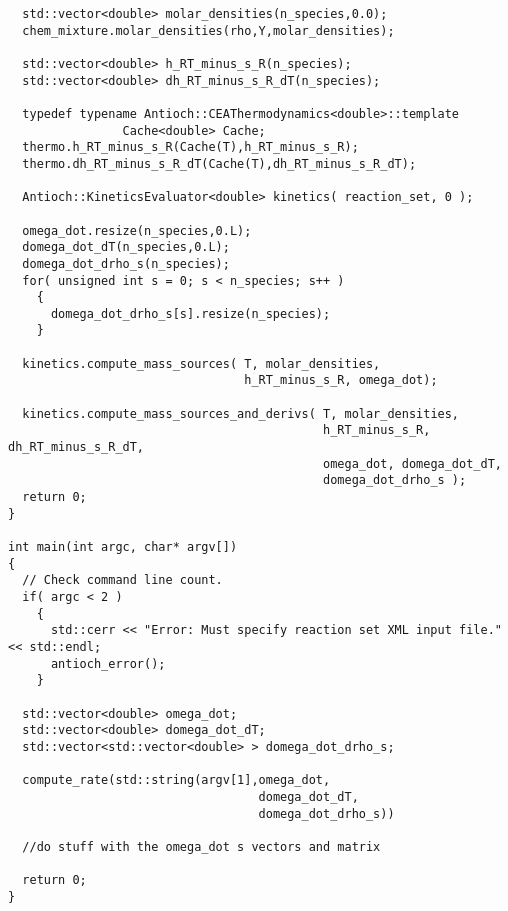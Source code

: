 \begin{verbatim}
  std::vector<double> molar_densities(n_species,0.0);
  chem_mixture.molar_densities(rho,Y,molar_densities);

  std::vector<double> h_RT_minus_s_R(n_species);
  std::vector<double> dh_RT_minus_s_R_dT(n_species);

  typedef typename Antioch::CEAThermodynamics<double>::template 
                Cache<double> Cache;
  thermo.h_RT_minus_s_R(Cache(T),h_RT_minus_s_R);
  thermo.dh_RT_minus_s_R_dT(Cache(T),dh_RT_minus_s_R_dT);

  Antioch::KineticsEvaluator<double> kinetics( reaction_set, 0 );

  omega_dot.resize(n_species,0.L);
  domega_dot_dT(n_species,0.L);
  domega_dot_drho_s(n_species);
  for( unsigned int s = 0; s < n_species; s++ )
    {
      domega_dot_drho_s[s].resize(n_species);
    }
  
  kinetics.compute_mass_sources( T, molar_densities, 
                                 h_RT_minus_s_R, omega_dot);

  kinetics.compute_mass_sources_and_derivs( T, molar_densities, 
                                            h_RT_minus_s_R, dh_RT_minus_s_R_dT,
                                            omega_dot, domega_dot_dT, 
                                            domega_dot_drho_s );
  return 0;
}

int main(int argc, char* argv[])
{
  // Check command line count.
  if( argc < 2 )
    {
      std::cerr << "Error: Must specify reaction set XML input file." << std::endl;
      antioch_error();
    }

  std::vector<double> omega_dot;
  std::vector<double> domega_dot_dT;
  std::vector<std::vector<double> > domega_dot_drho_s;

  compute_rate(std::string(argv[1],omega_dot,
                                   domega_dot_dT,
                                   domega_dot_drho_s))

  //do stuff with the omega_dot s vectors and matrix

  return 0;
}
\end{verbatim}
\nolinenumbers

